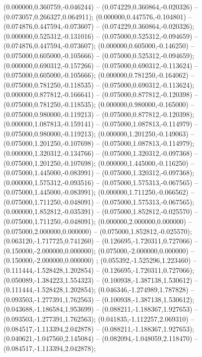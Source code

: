  (0.000000,0.360759,-0.046244) -- (0.074229,0.360864,-0.020326) -- (0.073057,0.266327,0.064911);
 (0.000000,0.447576,-0.104801) -- (0.074876,0.447594,-0.073607) -- (0.074229,0.360864,-0.020326);
 (0.000000,0.525312,-0.131016) -- (0.075000,0.525312,-0.094659) -- (0.074876,0.447594,-0.073607);
 (0.000000,0.605000,-0.146250) -- (0.075000,0.605000,-0.105666) -- (0.075000,0.525312,-0.094659);
 (0.000000,0.690312,-0.157266) -- (0.075000,0.690312,-0.113624) -- (0.075000,0.605000,-0.105666);
 (0.000000,0.781250,-0.164062) -- (0.075000,0.781250,-0.118535) -- (0.075000,0.690312,-0.113624);
 (0.000000,0.877812,-0.166641) -- (0.075000,0.877812,-0.120398) -- (0.075000,0.781250,-0.118535);
 (0.000000,0.980000,-0.165000) -- (0.075000,0.980000,-0.119213) -- (0.075000,0.877812,-0.120398);
 (0.000000,1.087813,-0.159141) -- (0.075000,1.087813,-0.114979) -- (0.075000,0.980000,-0.119213);
 (0.000000,1.201250,-0.149063) -- (0.075000,1.201250,-0.107698) -- (0.075000,1.087813,-0.114979);
 (0.000000,1.320312,-0.134766) -- (0.075000,1.320312,-0.097368) -- (0.075000,1.201250,-0.107698);
 (0.000000,1.445000,-0.116250) -- (0.075000,1.445000,-0.083991) -- (0.075000,1.320312,-0.097368);
 (0.000000,1.575312,-0.093516) -- (0.075000,1.575313,-0.067565) -- (0.075000,1.445000,-0.083991);
 (0.000000,1.711250,-0.066562) -- (0.075000,1.711250,-0.048091) -- (0.075000,1.575313,-0.067565);
 (0.000000,1.852812,-0.035391) -- (0.075000,1.852812,-0.025570) -- (0.075000,1.711250,-0.048091);
 (0.000000,2.000000,0.000000) -- (0.075000,2.000000,0.000000) -- (0.075000,1.852812,-0.025570);
 (0.063120,-1.717725,0.741260) -- (0.126695,-1.720311,0.727066) -- (0.150000,-2.000000,0.000000);
 (0.075000,-2.000000,0.000000) -- (0.150000,-2.000000,0.000000) ;
 (0.055392,-1.525296,1.223460) -- (0.111444,-1.528428,1.202854) -- (0.126695,-1.720311,0.727066);
 (0.050089,-1.384223,1.554323) -- (0.100938,-1.387138,1.530612) -- (0.111444,-1.528428,1.202854);
 (0.046346,-1.274989,1.787828) -- (0.093503,-1.277391,1.762563) -- (0.100938,-1.387138,1.530612);
 (0.043688,-1.186584,1.953699) -- (0.088211,-1.188367,1.927653) -- (0.093503,-1.277391,1.762563);
 (0.041835,-1.112257,2.069310) -- (0.084517,-1.113394,2.042878) -- (0.088211,-1.188367,1.927653);
 (0.040621,-1.047560,2.145084) -- (0.082094,-1.048059,2.118470) -- (0.084517,-1.113394,2.042878);
